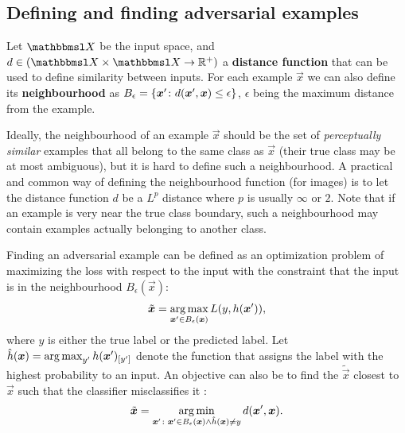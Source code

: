 \documentclass{article}
\begin{document}
\subsection{Defining and finding adversarial examples}

Let $\set X$ be the input space, and $d\in(\set X\times\set X\to \R^+)$ a \textbf{distance function} that can be used to define similarity between inputs. For each example $\vec x$ we can also define its \textbf{neighbourhood} as $B_{\epsilon} = \cbr{\vec x'\colon d(\vec x', \vec x) \leq \epsilon}$, $\epsilon$ being the maximum distance from the example.

Ideally, the neighbourhood of an example $\vec x$ should be the set of \textit{perceptually similar} examples that all belong to the same class as $\vec x$ (their true class may be at most ambiguous), but it is hard to define such a neighbourhood. A practical and common way of defining the neighbourhood function (for images) is to let the distance function $d$ be a $L^p$ distance where $p$ is usually $\infty$ or $2$. Note that if an example is very near the true class boundary, such a neighbourhood may contain examples actually belonging to another class. 

Finding an adversarial example can be defined as an optimization problem of maximizing the loss with respect to the input with the constraint that the input is in the neighbourhood $B_\epsilon(\vec x)$:
\begin{align}
    \tilde{\vec x} = \argmax_{\vec x'\in B_\epsilon(\vec x)} L(y, h(\vec x')) , \label{eq:untargeted-loss-attack}
\end{align}
where $y$ is either the true label or the predicted label. Let $\hat{h}(\vec x) = \argmax_{y'} h(\vec x')_\ind{y'}$ denote the function that assigns the label with the highest probability to an input.
An objective can also be to find the $\tilde{\vec x}$ closest to $\vec x$ such that the classifier misclassifies it \citep{Moosavi-Dezfooli:2016:DFSAMFDNN}:
\begin{align}
    \tilde{\vec x} = \argmin_{\vec x'\colon \vec x'\in B_\epsilon(\vec x) \land \hat{h}(\vec x) \neq y} d(\vec x', \vec x). \label{eq:untargeted-closest-attack}
\end{align}
\end{document}
